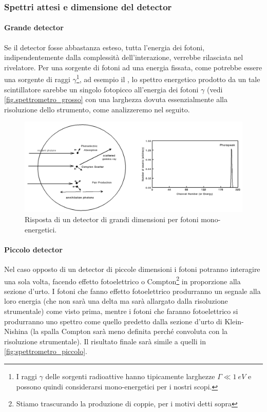  \subsubsection{Spettri attesi e dimensione del detector}
 \paragraph{Grande detector} Se il detector fosse abbastanza esteso, tutta l'energia dei fotoni, indipendentemente dalla complessità dell'interazione, verrebbe rilasciata nel rivelatore. Per una sorgente di fotoni ad una energia fissata, come potrebbe essere una sorgente di raggi $\gamma$\footnote{I raggi $\gamma$ delle sorgenti radioattive hanno tipicamente larghezze $\Gamma \ll \SI{1}{eV}$ e possono quindi considerarsi mono-energetici per i nostri scopi.},
 ad esempio il \cs, lo spettro energetico prodotto da un tale scintillatore sarebbe un singolo fotopicco all'energia dei fotoni $\gamma$ (vedi \autoref{fig.spettrometro_grosso} con una larghezza dovuta essenzialmente alla risoluzione dello strumento, come analizzeremo nel seguito.
 
 \begin{figure}[h]
 	\centering
 	\includegraphics[width=\textwidth]{spettrometro_grosso}
 	\caption{\label{fig:spettrometro_grsso}Risposta di un detector di grandi dimensioni per fotoni mono-energetici.}
 \end{figure}

 \paragraph{Piccolo detector}Nel caso opposto di un detector di piccole dimensioni i fotoni potranno interagire una sola volta, facendo effetto fotoelettrico o Compton\footnote{Stiamo trascurando la produzione di coppie, per i motivi detti sopra} in proporzione alla sezione d'urto. I fotoni che fanno effetto fotoelettrico produrranno un segnale alla loro energia (che non sarà una delta ma sarà allargato dalla risoluzione strumentale) come visto prima, mentre i fotoni che faranno fotoelettrico si produrranno uno spettro come quello predetto dalla sezione d'urto di Klein-Nishina (la spalla Compton sarà meno definita perché convoluta con la risoluzione strumentale). Il risultato finale sarà simile a quelli in \autoref{fig:spettrometro_piccolo}.
 
